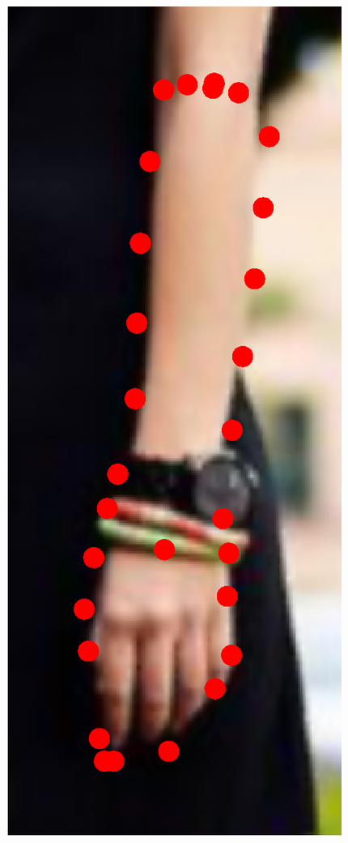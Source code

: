 \begin{figure}[!t]
    \includegraphics[height=\ofh]{resources/Fittings/15.eps}
    \hfill

\end{figure}

